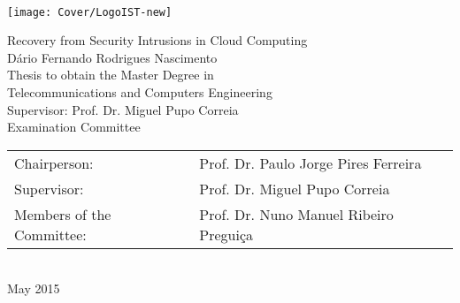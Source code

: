 \setcounter{page}{1} 


\thispagestyle{empty}
\begin{flushleft} ~\\ \vspace{-10mm} \hspace{-9mm}  \texttt{[image: Cover/LogoIST-new]} 
\\ \vspace{80mm}
\begin{centering}
{\FontLb Recovery from Security Intrusions in Cloud Computing} \\
\vspace{2.8cm}
{\FontMb Dário Fernando Rodrigues Nascimento} \\
\vspace{2cm}
{\FontSn Thesis to obtain the Master Degree in} \\
\vspace{0.3cm}
{\FontLb Telecommunications and Computers Engineering}\\ 
\vspace{1.1cm}
{\FontSn Supervisor: Prof. Dr. Miguel Pupo Correia}\\
\vspace{1.1cm}
{\FontMb Examination Committee} \\
\vspace{0.3cm}
{\FontSn %
\renewcommand{\arraystretch}{1.5} %
\begin{tabular}{ll}
Chairperson: & Prof.  Dr. Paulo Jorge Pires Ferreira \\ 
Supervisor: & Prof. Dr. Miguel Pupo Correia \\ 
Members of the Committee: & Prof. Dr. Nuno Manuel Ribeiro Preguiça
\end{tabular}}\\
\vspace{15mm}
{\FontMb May 2015} \\
\end{centering}
\let\thepage\relax
\end{flushleft}
\pagebreak


\clearpage

\thispagestyle{empty}
\cleardoublepage

\setcounter{page}{1} 

\baselineskip 18pt 